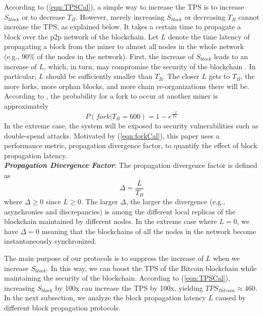 \documentclass[10pt,journal,compsoc]{IEEEtran}
\begin{document}
According to (\ref{eqn:TPSCal}), a simple way to increase the TPS is to increase ${S_{block}}$ or to decrease ${T_B}$. However, merely increasing ${S_{block}}$ or decreasing ${T_B}$ cannot increase the TPS, as explained below.  It takes a certain time to propagate a block over the p2p network of the blockchain. Let $L$ denote the time latency of propagating a block from the miner to almost all nodes in the whole network (e.g., $90\%$ of the nodes in the network). First, the increase of ${S_{block}}$ leads to an increase of $L$, which, in turn, may compromise the security of the blockchain \cite{gervais2016security}. In particular, $L$ should be sufficiently smaller than ${T_B}$. The closer $L$ gets to ${T_B}$, the more forks, more orphan blocks, and more chain re-organizations there will be. According to \cite{klarman2018bloxroute}, the probability for a fork to occur at another miner is approximately 
\begin{equation}
	\label{eqn:forkCal}
	P(fork|{T_B} = 600) = 1 - {e^{\frac{{ - L}}{{{T_B}}}}}
\end{equation}
In the extreme case, the system will be exposed to security vulnerabilities such as double-spend attacks\cite{gervais2016security}. Motivated by (\ref{eqn:forkCal}), this paper uses a performance metric, propagation divergence factor, to quantify the effect of block propagation latency. \\
\textsl{ \textbf{Propagation Divergence Factor}}: The propagation divergence factor is defined as
\begin{equation}
	\label{eqn:PDF}
	\Delta  = \frac{L}{{{T_B}}}
\end{equation}
where $\Delta  \ge 0$  since $L \ge 0$. The larger $\Delta $, the larger the divergence (e.g., asynchronies and discrepancies) is among the different local replicas of the blockchain maintained by different nodes. In the extreme case where $L = 0$, we have $\Delta  = 0$ meaning that the blockchains of all the nodes in the network become instantaneously synchronized. 

The main purpose of our protocols is to suppress the increase of $L$ when we increase ${S_{block}}$. In this way, we can boost the TPS of the Bitcoin blockchain while maintaining the security of the blockchain. According to (\ref{eqn:TPSCal}), increasing ${S_{block}}$ by 100x can increase the TPS by 100x, yielding $TP{S_{Bitcoin}} \approx 460$. In the next subsection, we analyze the block propagation latency $L$ caused by different block propagation protocols. 
\end{document}
